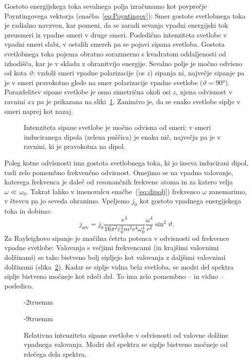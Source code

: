 Gostoto energijskega toka sevalnega polja izračunamo kot povprečje
Poyntingovega vektorja (enačba~\ref{eq:Poyntingov}):
Smer gostote svetlobnega toka je radialno navzven, 
kar pomeni, da se zaradi sevanja vpadni energijski tok preusmeri iz vpadne smeri
v druge smeri. Posledično intenziteta svetlobe v vpadni smeri slabi, v ostalih smereh pa se 
pojavi sipana svetloba. Gostota svetlobnega toka 
pojema obratno sorazmerno s kvadratom oddaljenosti od izhodišča, kar je v skladu
z ohranitvijo energije.  
Sevalno polje je močno odvisno od kota $\vartheta$: vzdolž smeri vpadne 
polarizacije (os $z$) sipanja ni, največje sipanje pa je v smeri pravokotno glede na smer 
polarizacije vpadne svetlobe ($\vartheta = 90\si{\degree}$). Porazdelitev sipane svetlobe 
je osno simetrična okoli osi $z$, njena odvisnost v ravnini $xz$ pa je prikazana na 
sliki~\ref{fig:07_dipol}. Zanimivo je, da se enako svetlobe siplje v smeri naprej kot nazaj.
\begin{figure}[!ht]
\centering
\def\svgwidth{60truemm} 

\caption{Intenziteta sipane svetlobe je močno odvisna od smeri: v smeri induciranega
dipola (zelena puščica) je enaka nič, največja pa je v ravnini, ki je pravokotna na dipol. }
\label{fig:07_dipol}
\end{figure}

Poleg kotne odvisnosti ima gostota svetlobnega toka, ki jo izseva 
inducirani dipol, 
tudi zelo pomembno frekvenčno odvisnost. Omejimo se na vpadno valovanje, katerega 
frekvenca je daleč od resonančnih frekvenc atoma in za katero velja 
$\omega \ll \omega_0$. Takrat lahko v imenovalcu enačbe~(\ref{eq:dipolj}) 
frekvenco $\omega$ zanemarimo, v števcu
pa jo seveda ohranimo. Vpeljemo $j_0$ kot gostoto vpadnega energijskega toka in dobimo:
\begin{equation}
j_\mathrm{sev}
= j_0 \frac{e^4}{16 \pi^2 \varepsilon_0^2 m^2 c^4 \omega_0^4} \frac{\omega^4}{r^2} 
\sin^2 \vartheta.
\label{eq:07_53}
\end{equation}
Za Rayleighovo sipanje je značilna četrta potenca v odvisnosti od frekvence 
vpadne svetlobe:
Valovanja s večjimi frekvencami (in krajšimi valovnimi dolžinami) se tako 
bistveno bolj sipljejo kot valovanja z daljšimi valovnimi dolžinami 
(slika~\ref{fig:07_rayleighlambda}). Kadar se
siplje vidna bela svetloba, se modri del spektra siplje bistveno močneje kot rdeči
del. To ima zelo pomembno -- in vidno -- posledico.
\begin{figure}[!ht]
\vglue-2truemm
\centering
\def\svgwidth{60truemm} 

\caption{Relativna intenziteta sipane svetlobe v odvisnosti od valovne dolžine vpadnega
valovanja. Modri del spektra se siplje bistveno močneje od rdečega dela spektra.}
\label{fig:07_rayleighlambda}
\vglue-9truemm
\end{figure}

